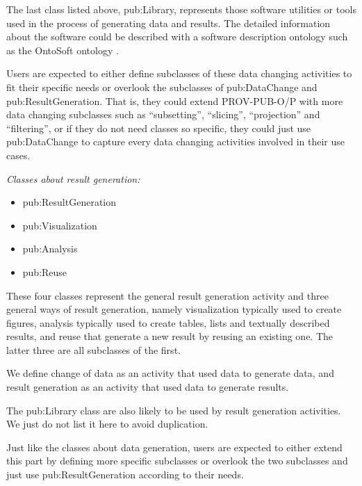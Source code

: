 The last class listed above, pub:Library, represents those software utilities or tools used in the process of generating data and results. The detailed information about the software could be described with a software description ontology such as the OntoSoft ontology \cite{gil2015ontosoft}.

Users are expected to either define subclasses of these data changing activities to fit their specific needs or overlook the subclasses of pub:DataChange and pub:ResultGeneration. That is, they could extend PROV-PUB-O/P with more data changing subclasses such as ``subsetting'', ``slicing'', ``projection'' and ``filtering'', or if they do not need classes so specific, they could just use pub:DataChange to capture every data changing activities involved in their use cases.

\noindent\emph{Classes about result generation:}
\begin{itemize}
	\item pub:ResultGeneration
	\item pub:Visualization
	\item pub:Analysis
	\item pub:Reuse
\end{itemize}
These four classes represent the general result generation activity and three general ways of result generation, namely visualization typically used to create figures, analysis typically used to create tables, lists and textually described results, and reuse that generate a new result by reusing an existing one. The latter three are all subclasses of the first.

We define change of data as an activity that used data to generate data, and result generation as an activity that used data to generate results.

The pub:Library class are also likely to be used by result generation activities. We just do not list it here to avoid duplication.

Just like the classes about data generation, users are expected to either extend this part by defining more specific subclasses or overlook the two subclasses and just use pub:ResultGeneration according to their needs.

